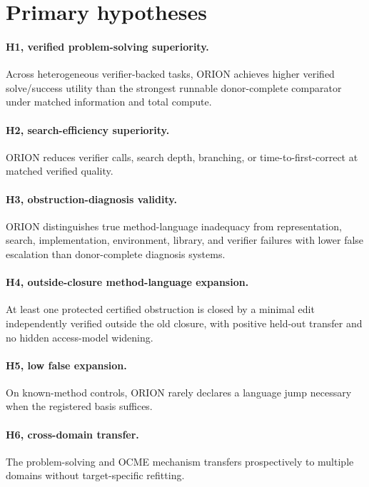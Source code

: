 \section{Primary hypotheses}
\paragraph{H1, verified problem-solving superiority.}
Across heterogeneous verifier-backed tasks, ORION achieves higher verified solve/success utility than the strongest runnable donor-complete comparator under matched information and total compute.

\paragraph{H2, search-efficiency superiority.}
ORION reduces verifier calls, search depth, branching, or time-to-first-correct at matched verified quality.

\paragraph{H3, obstruction-diagnosis validity.}
ORION distinguishes true method-language inadequacy from representation, search, implementation, environment, library, and verifier failures with lower false escalation than donor-complete diagnosis systems.

\paragraph{H4, outside-closure method-language expansion.}
At least one protected certified obstruction is closed by a minimal edit independently verified outside the old closure, with positive held-out transfer and no hidden access-model widening.

\paragraph{H5, low false expansion.}
On known-method controls, ORION rarely declares a language jump necessary when the registered basis suffices.

\paragraph{H6, cross-domain transfer.}
The problem-solving and OCME mechanism transfers prospectively to multiple domains without target-specific refitting.

